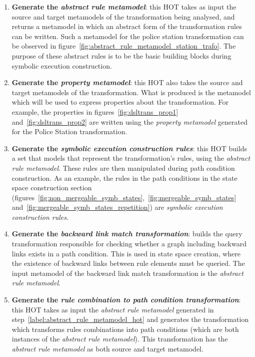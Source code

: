 \begin{enumerate}

  \item\label{label:abstract_rule_metamodel_hot} \textbf{Generate the
  \emph{abstract rule metamodel}}: this HOT takes as input the source and target
  metamodels of the transformation being analysed, and returns a metamodel in
  which an abstract form of the transformation rules can be written. Such a
  metamodel for the police station transformation can be observed in
  figure~\ref{fig:abstract_rule_metamodel_station_trafo}. The purpose of these
  abstract rules is to be the basic building blocks during symbolic execution
  construction.\\

  \item \textbf{Generate the \emph{property metamodel}}: this HOT also takes the
  source and target metamodels of the transformation. What is produced is the
  metamodel which will be used to express properties about the transformation.
  For example, the properties in  figures~\ref{fig:dsltrans_prop1}
  and~\ref{fig:dsltrans_prop2} are written using the \emph{property metamodel}
  generated for the Police Station transformation.\\

  \item \textbf{Generate the \emph{symbolic execution construction rules}}: this
  HOT builds a set that models that represent the transformation's rules, using
  the \emph{abstract rule metamodel}. These rules are then manipulated during
  path condition construction. As an example, the rules in the path
  conditions in the state space construction section
  (figures~\ref{fig:non_mergeable_symb_states},~\ref{fig:mergeable_symb_states}
  and~\ref{fig:mergeable_symb_states_repetition}) are \emph{symbolic execution
  construction rules}.\\

  \item \textbf{Generate the \emph{backward link match transformation}}: builds
  the query transformation responsible for checking whether a graph including
  backward links exists in a path condition. This is used in state space
  creation, where the existence of backward links between rule elements must be
  queried. The input metamodel of the backward link match transformation is the
  \emph{abstract rule metamodel}.\\

  \item \textbf{Generate the \emph{rule combination to path condition
  transformation}}: this HOT takes as input the \emph{abstract rule metamodel}
  generated in step~\ref{label:abstract_rule_metamodel_hot} and generates the
  transformation which transforms rules combinations into path conditions (which
  are both instances of the \emph{abstract rule metamodel}). This transformation
  has the \emph{abstract rule metamodel} as both source and target metamodel.\\


\end{enumerate}
